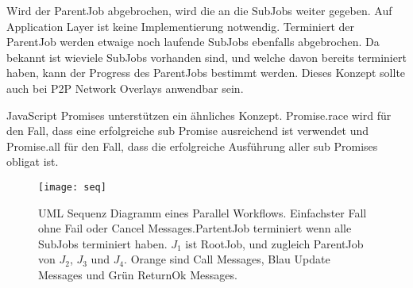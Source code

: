 Wird der ParentJob abgebrochen, wird die \CancelMessage{} an die SubJobs weiter gegeben. Auf Application Layer ist keine Implementierung notwendig.
Terminiert der ParentJob werden et­wa­ige noch laufende SubJobs ebenfalls abgebrochen.
Da bekannt ist wieviele SubJobs vorhanden sind, und welche davon bereits terminiert haben, kann der Progress des ParentJobs bestimmt werden.
Dieses Konzept sollte auch bei P2P Network Overlays anwendbar sein.

JavaScript Promises unterstützen ein ähnliches Konzept.
Promise.race wird für den Fall, dass eine erfolgreiche sub Promise ausreichend ist verwendet und Promise.all für den Fall, dass die erfolgreiche Ausführung aller sub Promises obligat ist.

\begin{wrapfigure}{R}{1\textwidth}
  \vspace{-20pt}
  \begin{center}
    \texttt{[image: seq]}
  \end{center}
  \caption{UML Sequenz Diagramm eines Parallel Workflows. Einfachster Fall ohne Fail oder Cancel Messages.PartentJob terminiert wenn alle SubJobs terminiert haben. $J_1$ ist RootJob, und zugleich ParentJob von $J_2$, $J_3$ und $J_4$. Orange sind Call Messages, Blau Update Messages und Grün ReturnOk Messages.}
  \label{seq}
\end{wrapfigure}
